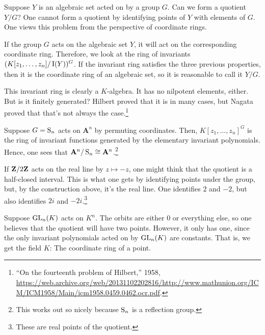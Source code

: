 \documentclass [11 pt, oneside] {article}
\begin{document}
Suppose $Y$ is an algebraic set acted on by a group $G$. Can we form a quotient $Y/G$? One cannot form a quotient by identifying points of $Y$ with elements of $G$. One views this problem from the perspective of coordinate rings. 

If the group $G$ acts on the algebraic set $Y$, it will act on the corresponding coordinate ring. Therefore, we look at the ring of invariants $(K[z_1,\hdots,z_n]/\operatorname{I}(Y))^G$. If the invariant ring satisfies the three previous properties, then it is the coordinate ring of an algebraic set, so it is reasonable to call it $Y/G$.

This invariant ring is clearly a $K$-algebra. It has no nilpotent elements, either. But is it finitely generated? Hilbert proved that it is in many cases, but Nagata proved that that's not always the case.\footnote{``On the fourteenth problem of Hilbert,'' 1958, \url{https://web.archive.org/web/20131102202816/http://www.mathunion.org/ICM/ICM1958/Main/icm1958.0459.0462.ocr.pdf}.}

\begin{example}[ ]\label{}
Suppose $G=\operatorname{S}_n$ acts on $\mathbf{A}^n$ by permuting coordinates. Then, $K[z_1,\hdots, z_n]^G$ is the ring of invariant functions generated by the elementary invariant polynomials. Hence, one sees that $\mathbf{A}^n/\operatorname{S}_n\cong \mathbf{A}^n$.\footnote{This works out so nicely because $\operatorname{S}_n$ is a reflection group.}
\end{example}


If $\mathbf Z / 2\mathbf Z$ acts on the real line by $z\longmapsto -z$, one might think that the quotient is a half-closed interval. This is what one gets by identifying points under the group, but, by the construction above, it's the real line. One identifies $2$ and $-2$, but also identifies $2i$ and $-2i$.\footnote{These are real points of the quotient.}


 \begin{example}[ ]\label{}
Suppose $\operatorname{GL}_{n}(K)$ acts on $K^n$. The orbits are either $0$ or everything else, so one believes that the quotient will have two points. However, it only has one, since the only invariant polynomials acted on by $\operatorname{GL}_{n}(K)$ are constants. That is, we get the field $K$: The coordinate ring of a point.
\end{example}
\end{document}
